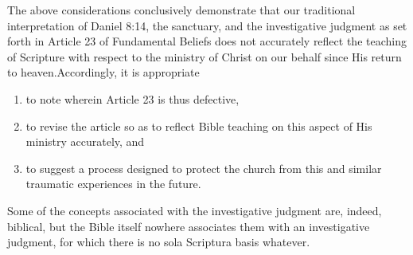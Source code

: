 The above considerations conclusively demonstrate that our traditional
interpretation of Daniel 8:14, the sanctuary, and the investigative judgment
as set forth in Article 23 of Fundamental Beliefs does not accurately
reflect the teaching of Scripture with respect to the ministry of Christ on
our behalf since His return to heaven.Accordingly, 
it is appropriate
\begin{enumerate}
	\item to note wherein Article 23 is thus defective,
	\item to revise the article so
as to reflect Bible teaching on this aspect of His ministry accurately, and
	\item to suggest a process designed to protect the church from this and
similar traumatic experiences in the future.
\end{enumerate}

Some of the concepts associated with the investigative judgment are, indeed,
biblical, but the Bible itself nowhere associates them with an investigative
judgment, for which there is no sola Scriptura basis whatever.

